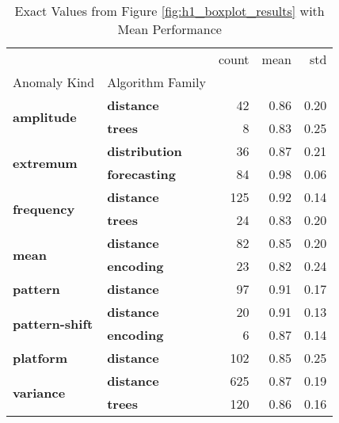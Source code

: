 \begin{table}
\centering
\caption{Exact Values from Figure \ref{fig:h1_boxplot_results} with Mean Performance }
\label{tab:best-performer}
\begin{tabular}{llrrr}
\toprule
 &  & count & mean & std \\
Anomaly Kind & Algorithm Family &  &  &  \\
\midrule
\multirow[t]{2}{*}{\textbf{amplitude}} & \textbf{distance} & 42 & 0.86 & 0.20 \\
\textbf{} & \textbf{trees} & 8 & 0.83 & 0.25 \\
\cline{1-5}
\multirow[t]{2}{*}{\textbf{extremum}} & \textbf{distribution} & 36 & 0.87 & 0.21 \\
\textbf{} & \textbf{forecasting} & 84 & 0.98 & 0.06 \\
\cline{1-5}
\multirow[t]{2}{*}{\textbf{frequency}} & \textbf{distance} & 125 & 0.92 & 0.14 \\
\textbf{} & \textbf{trees} & 24 & 0.83 & 0.20 \\
\cline{1-5}
\multirow[t]{2}{*}{\textbf{mean}} & \textbf{distance} & 82 & 0.85 & 0.20 \\
\textbf{} & \textbf{encoding} & 23 & 0.82 & 0.24 \\
\cline{1-5}
\textbf{pattern} & \textbf{distance} & 97 & 0.91 & 0.17 \\
\cline{1-5}
\multirow[t]{2}{*}{\textbf{pattern-shift}} & \textbf{distance} & 20 & 0.91 & 0.13 \\
\textbf{} & \textbf{encoding} & 6 & 0.87 & 0.14 \\
\cline{1-5}
\textbf{platform} & \textbf{distance} & 102 & 0.85 & 0.25 \\
\cline{1-5}
\multirow[t]{2}{*}{\textbf{variance}} & \textbf{distance} & 625 & 0.87 & 0.19 \\
\textbf{} & \textbf{trees} & 120 & 0.86 & 0.16 \\
\cline{1-5}
\bottomrule
\end{tabular}
\end{table}
